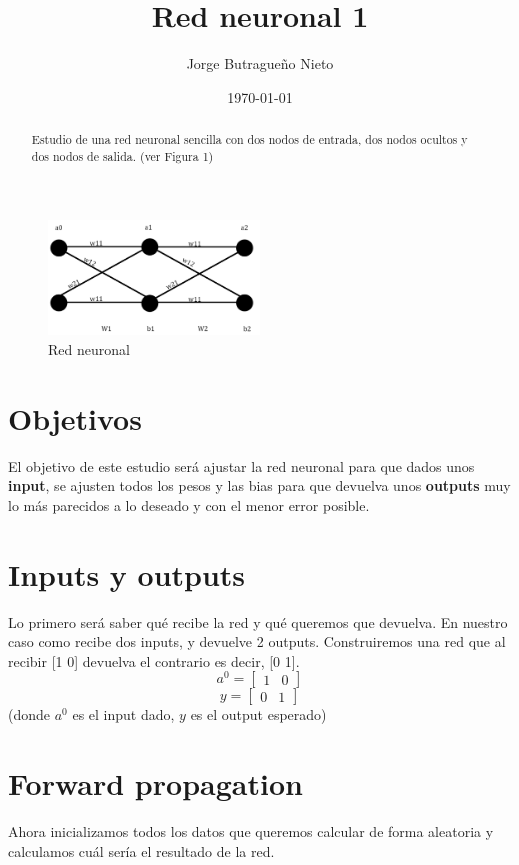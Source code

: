 \documentclass{article}
\title{Red neuronal 1}
\author{Jorge Butragueño Nieto}
\date{\today}
\begin{document}
		\maketitle
	
	\begin{abstract}
		Estudio de una red neuronal sencilla con dos nodos de entrada, dos  nodos ocultos y dos nodos de salida. (ver Figura 1)
	\end{abstract}
	\begin{figure}[h]  %
		\centering    %
		\includegraphics[width=0.5\textwidth]{image.png}  %
		\caption{Red neuronal}  %
		\label{fig:ejemplo}  %
	\end{figure}
	\section{Objetivos}
	El objetivo de este estudio será ajustar la red neuronal para que dados unos \textbf{input}, se ajusten todos los pesos y las bias para que devuelva unos \textbf{outputs} muy lo más parecidos a lo deseado y con el menor error posible.
	\section{Inputs y outputs}
	Lo primero será saber qué recibe la red y qué queremos que devuelva. En nuestro caso como recibe dos inputs, y devuelve 2 outputs.
	Construiremos una red que al recibir [1 0] devuelva el contrario es decir, [0 1].
	 \[a^0 = \begin{bmatrix}
	1 & 0
	\end{bmatrix}
	\]
	\[y = \begin{bmatrix}
		0 & 1
	\end{bmatrix}
	\]
	(donde $a^0$ es el input dado, $y$ es el output esperado) \\
	\section{Forward propagation}
	Ahora inicializamos todos los datos que queremos calcular de forma aleatoria y calculamos cuál sería el resultado de la red.
\end{document}
